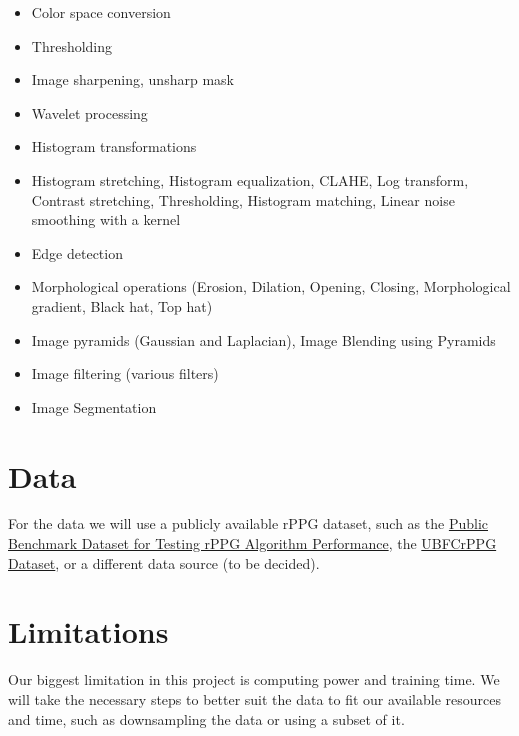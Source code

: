 \documentclass{article}
\begin{document}
\begin{itemize}
	\item Color space conversion
	\item Thresholding
	\item Image sharpening, unsharp mask
	\item Wavelet processing
	\item Histogram transformations
	\item Histogram stretching, Histogram equalization, CLAHE, Log transform, Contrast stretching, Thresholding, Histogram matching, Linear noise smoothing with a kernel
	\item Edge detection
	\item Morphological operations (Erosion, Dilation, Opening, Closing, Morphological gradient, Black hat, Top hat)
	\item Image pyramids (Gaussian and Laplacian), Image Blending using Pyramids
	\item Image filtering (various filters)
	\item Image Segmentation
\end{itemize}

\section*{Data}
For the data we will use a publicly available rPPG dataset, such as the
\href{https://data.4tu.nl/articles/dataset/Public_Benchmark_Dataset_for_Testing_rPPG_Algorithm_Performance/12684059/1}{Public Benchmark Dataset for Testing rPPG Algorithm Performance}, the \href{https://sites.google.com/view/ybenezeth/ubfcrppg}{UBFCrPPG Dataset}, or a different data source (to be decided).

\section*{Limitations}

Our biggest limitation in this project is computing power and training time. We will take the necessary steps to better suit the data to fit our available resources and time, such as downsampling the data or using a subset of it.

\printbibliography
\end{document}
